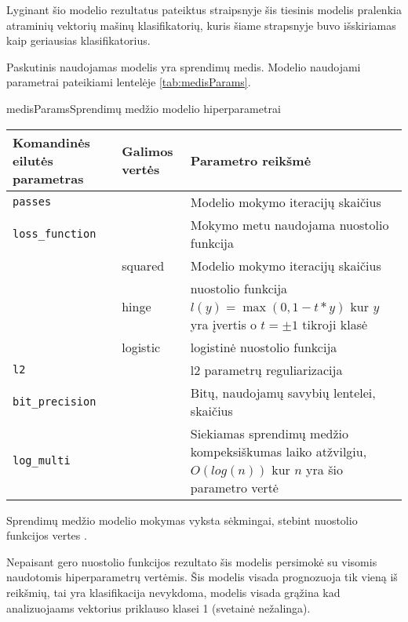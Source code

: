 
Lyginant šio modelio rezultatus pateiktus \cite{comp} straipsnyje šis tiesinis modelis pralenkia atraminių vektorių mašinų klasifikatorių, kuris šiame strapsnyje buvo išskiriamas kaip geriausias klasifikatorius.


Paskutinis naudojamas modelis yra sprendimų medis. Modelio naudojami parametrai pateikiami lentelėje \vref{tab:medisParams}.


\begin{ktutable}{medisParams}{Sprendimų medžio modelio hiperparametrai}
    \begin{tabular}{| l | l | p{7cm}|}
    \hline
        Komandinės eilutės parametras & Galimos vertės & Parametro reikšmė\\ \hline
        \texttt{passes} &  & Modelio mokymo iteracijų skaičius \\ \hline
        \texttt{loss\_function} &          & Mokymo metu naudojama nuostolio funkcija \\
                               & squared  & Modelio mokymo iteracijų skaičius \\
                               & hinge    & nuostolio funkcija $l(y) = \max(0, 1 - t * y)$ kur $y$ yra įvertis o $t = \pm 1$ tikroji klasė  \\
                               & logistic & logistinė nuostolio funkcija \\ \hline
        \texttt{l2} & & l2 parametrų reguliarizacija \\ \hline
        \texttt{bit\_precision} & & Bitų, naudojamų savybių lentelei, skaičius\\ \hline
        \texttt{log\_multi} & & Siekiamas sprendimų medžio kompeksiškumas laiko atžvilgiu, $O(log(n))$ kur $n$ yra šio parametro vertė\\ \hline
    \end{tabular}
\end{ktutable}

Sprendimų medžio modelio mokymas vyksta sėkmingai, stebint nuostolio funkcijos vertes .


Nepaisant gero nuostolio funkcijos rezultato šis modelis persimokė su visomis naudotomis hiperparametrų vertėmis. Šis modelis visada prognozuoja tik vieną iš reikšmių, tai yra klasifikacija nevykdoma, modelis visada grąžina kad analizuojaams vektorius priklauso klasei 1 (svetainė nežalinga).

